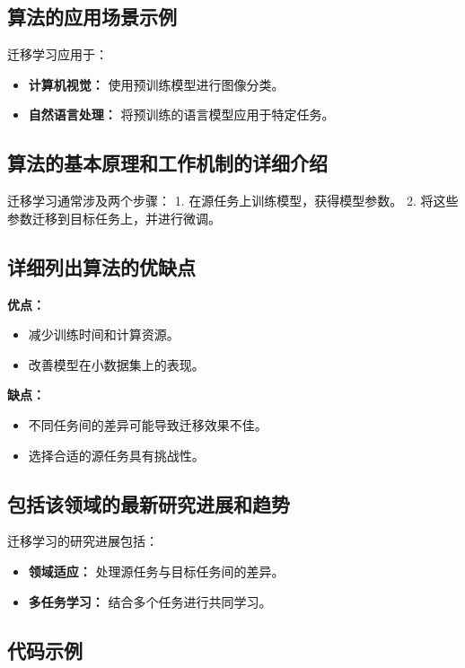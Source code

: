 \subsection*{算法的应用场景示例}
迁移学习应用于：
\begin{itemize}
    \item \textbf{计算机视觉：} 使用预训练模型进行图像分类。
    \item \textbf{自然语言处理：} 将预训练的语言模型应用于特定任务。
\end{itemize}

\subsection*{算法的基本原理和工作机制的详细介绍}
迁移学习通常涉及两个步骤：
1. 在源任务上训练模型，获得模型参数。
2. 将这些参数迁移到目标任务上，并进行微调。

\subsection*{详细列出算法的优缺点}
\textbf{优点：}
\begin{itemize}
    \item 减少训练时间和计算资源。
    \item 改善模型在小数据集上的表现。
\end{itemize}

\textbf{缺点：}
\begin{itemize}
    \item 不同任务间的差异可能导致迁移效果不佳。
    \item 选择合适的源任务具有挑战性。
\end{itemize}

\subsection*{包括该领域的最新研究进展和趋势}
迁移学习的研究进展包括：
\begin{itemize}
    \item \textbf{领域适应：} 处理源任务与目标任务间的差异。
    \item \textbf{多任务学习：} 结合多个任务进行共同学习。
\end{itemize}
\subsection*{代码示例}
\begin{lstlisting}

\end{lstlisting}


